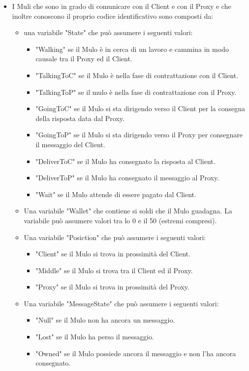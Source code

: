 \documentclass[13pt,a4paper]{article}
\begin{document}
\begin{itemize}
	
	\item I Muli che sono in grado di comunicare con il Client e con il Proxy e che inoltre conoscono il proprio codice identificativo sono composti da:
	\begin{itemize}
		\item una variabile "State" che può assumere i seguenti valori:
		\begin{itemize}
			\item "Walking" se il Mulo è in cerca di un lavoro e cammina in modo causale tra il Proxy ed il Client.
			\item "TalkingToC" se il Mulo è nella fase di contrattazione con il Client.
			\item "TalkingToP" se il mulo è nella fase di contrattazione con il Proxy.
			\item "GoingToC" se il Mulo si sta dirigendo verso il Client per la consegna della risposta data dal Proxy.
			\item "GoingToP" se il Mulo si sta dirigendo verso il Proxy per consegnare il messaggio del Client.
			\item "DeliverToC" se il Mulo ha consegnato la risposta al Client.
			\item "DeliverToP" se il Mulo ha consegnato il messaggio al Proxy.
			\item "Wait" se il Mulo attende di essere pagato dal Client.
		\end{itemize}
		\item Una variabile "Wallet" che contiene si soldi che il Mulo guadagna.  La variabile può assumere valori tra lo 0 e il 50 (estremi compresi).
		\item Una variabile "Posiction" che può assumere i seguenti valori:
		\begin{itemize}
			\item "Client" se il Mulo si trova in prossimità del Client.
			\item "Middle" se il Mulo si trova tra il Client ed il Proxy.
			\item "Proxy" se il Mulo si trova in prossimità del Proxy.
		\end{itemize}
	\item Una variabile "MessageState" che può assumere i seguenti valori:
	\begin{itemize}
		\item "Null" se il Mulo non ha ancora un messaggio.
		\item "Lost" se il Mulo ha perso il messaggio.
		\item "Owned" se il Mulo possiede ancora il messaggio e non l'ha ancora consegnato. 

\end{itemize}
\end{itemize}
\end{itemize}
\end{document}
